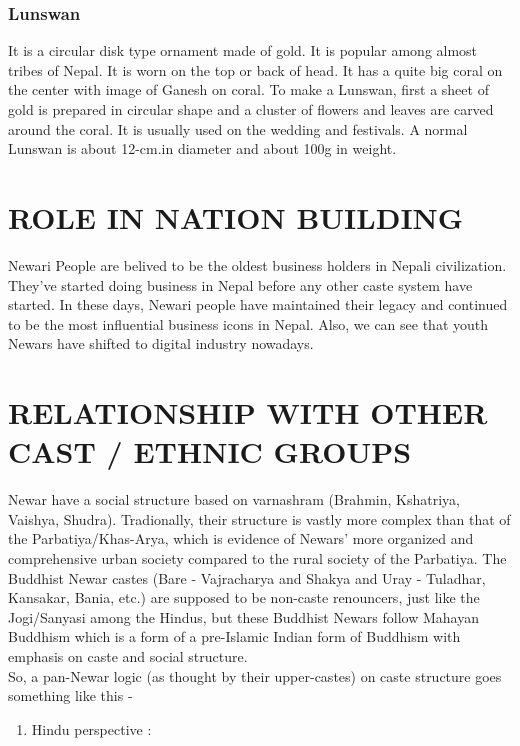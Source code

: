 \documentclass[a4paper,13pt, margin=0.9in]{article}
\begin{document}
\begin{flushleft}
	\subsubsection{Lunswan}

	It is a circular disk type ornament made of gold. It is popular among almost tribes of Nepal. It is worn on the top or back of head. It has a quite big coral on the center with image of Ganesh on coral. To make a Lunswan, first a sheet of gold is prepared in circular shape and a cluster of flowers and leaves are carved around the coral. It is usually used on the wedding and festivals. A normal Lunswan is about 12-cm.in diameter and about 100g in weight.

	\newpage
	\section{ROLE IN NATION BUILDING}
	Newari People are belived to be the oldest business holders in Nepali civilization. They've started doing business in Nepal before any other caste system have started. In these days, Newari people have maintained their legacy and continued to be the most influential business icons in Nepal. Also, we can see that youth Newars have shifted to digital industry nowadays.

	\newpage
	\section{RELATIONSHIP WITH OTHER CAST / ETHNIC GROUPS}
	Newar have a social structure based on varnashram (Brahmin, Kshatriya, Vaishya, Shudra). Tradionally, their structure is vastly more complex than that of the Parbatiya/Khas-Arya, which is evidence of Newars’ more organized and comprehensive urban society compared to the rural society of the Parbatiya. The Buddhist Newar castes (Bare - Vajracharya and Shakya and Uray - Tuladhar, Kansakar, Bania, etc.) are supposed to be non-caste renouncers, just like the Jogi/Sanyasi among the Hindus, but these Buddhist Newars follow Mahayan Buddhism which is a form of a pre-Islamic Indian form of Buddhism with emphasis on caste and social structure.\\

	So, a pan-Newar logic (as thought by their upper-castes) on caste structure goes something like this -

	\begin{enumerate}


		\item Hindu perspective :


\end{enumerate}
\end{flushleft}
\end{document}
